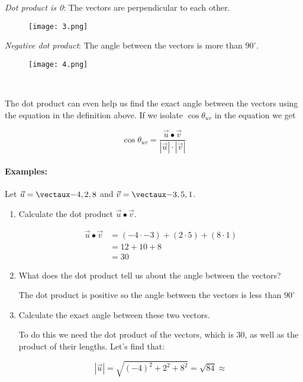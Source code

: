 \documentclass{article}
\begin{document}
\begin{minipage}{0.45\textwidth}
\begin{flushleft}
\textit{Dot product is 0}: The vectors are perpendicular to each other. 
\end{flushleft}
\end{minipage} \hfill
\begin{minipage}{0.45\textwidth}
\begin{figure}[H]
\texttt{[image: 3.png]}
\end{figure}
\end{minipage}


\begin{minipage}{0.45\textwidth}
\begin{flushleft}
\textit{Negative dot product}: The angle between the vectors is more than $90^\circ$.  
\end{flushleft}
\end{minipage} \hfill
\begin{minipage}{0.45\textwidth}
\begin{figure}[H]
\texttt{[image: 4.png]}
\end{figure}
\end{minipage}

\

The dot product can even help us find the exact angle between the vectors using the equation in the definition above. If we isolate $\cos \theta_{uv}$ in the equation we get 

\[
\cos\theta_{uv}=\frac{\vec{u}\bullet\vec{v}}{|\vec{u}|\cdot|\vec{v}|}
\]

\paragraph{Examples:} 

Let $\vec{u} = \vect{-4,2,8}$ and $\vec{v} = \vect{-3,5,1}$.

\begin{enumerate}
	\item Calculate the dot product $\vec{u}\bullet\vec{v}$.

	
	\begin{align*}
	\vec{u}\bullet\vec{v} &= (-4\cdot -3)+(2\cdot 5)+(8\cdot 1)\\
	&= 12+10+8\\
	&=30
	\end{align*}

	\item What does the dot product tell us about the angle between the vectors? 

	The dot product is positive so the angle between the vectors is less than $90^\circ$
	
	\item Calculate the exact angle between these two vectors. 

	To do this we need the dot product of the vectors, which is $30$, as well as the product of their lengths. Let's find that: 

	\[
	|\vec{u}| = \sqrt{(-4)^2+2^2+8^2} = \sqrt{84} \approx 
	\]


\end{enumerate}
\end{document}

